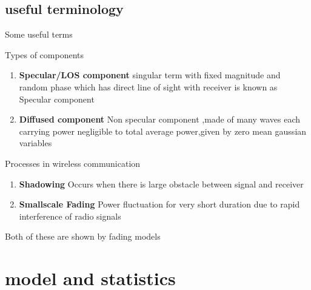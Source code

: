 \documentclass{beamer}
\begin{document}
\subsection{useful terminology}
\begin{frame}{Some useful terms}
\begin{block}{Types of components}
\begin{enumerate}
    \item \textbf{Specular/LOS component } singular term with fixed magnitude and random phase which has direct line of sight with receiver is known as Specular component
    \item \textbf{Diffused component} Non specular component ,made of many waves each carrying power negligible to total average power,given by zero mean gaussian variables 
\end{enumerate}
\end{block}
\begin{block}{Processes in wireless communication}
\begin{enumerate}
    \item \textbf{Shadowing} Occurs when there is large obstacle between signal and receiver
    \item \textbf{Smallscale Fading} Power fluctuation for very short duration due to rapid interference of radio signals 
\end{enumerate}
Both of these are shown by fading models
\end{block}
\end{frame}
\section{model and statistics}
\end{document}
